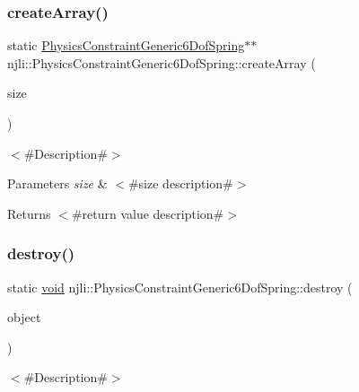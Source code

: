 \subsubsection{\texorpdfstring{create\+Array()}{createArray()}}
{\footnotesize\ttfamily static \mbox{\hyperlink{classnjli_1_1_physics_constraint_generic6_dof_spring}{Physics\+Constraint\+Generic6\+Dof\+Spring}}$\ast$$\ast$ njli\+::\+Physics\+Constraint\+Generic6\+Dof\+Spring\+::create\+Array (\begin{DoxyParamCaption}\item[{const \mbox{\hyperlink{_util_8h_a10e94b422ef0c20dcdec20d31a1f5049}{u32}}}]{size }\end{DoxyParamCaption})\hspace{0.3cm}{\ttfamily [static]}}

$<$\#\+Description\#$>$


\begin{DoxyParams}{Parameters}
{\em size} & $<$\#size description\#$>$\\
\hline
\end{DoxyParams}
\begin{DoxyReturn}{Returns}
$<$\#return value description\#$>$ 
\end{DoxyReturn}
\mbox{\label{classnjli_1_1_physics_constraint_generic6_dof_spring_acbcad205ab444a397ec02dfc592fb202}} 
\subsubsection{\texorpdfstring{destroy()}{destroy()}}
{\footnotesize\ttfamily static \mbox{\hyperlink{_thread_8h_af1e856da2e658414cb2456cb6f7ebc66}{void}} njli\+::\+Physics\+Constraint\+Generic6\+Dof\+Spring\+::destroy (\begin{DoxyParamCaption}\item[{\mbox{\hyperlink{classnjli_1_1_physics_constraint_generic6_dof_spring}{Physics\+Constraint\+Generic6\+Dof\+Spring}} $\ast$}]{object }\end{DoxyParamCaption})\hspace{0.3cm}{\ttfamily [static]}}

$<$\#\+Description\#$>$


